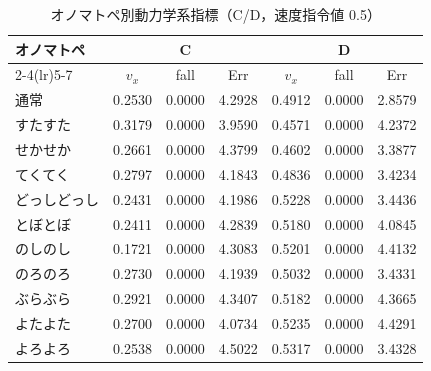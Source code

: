 \begin{table}[H]
  \centering
  \caption{オノマトペ別動力学系指標（C/D，速度指令値 0.5）}
  \label{tab:rl_cd_onom_dynamics}
  \small
  \setlength{\tabcolsep}{3.5pt}
  \begin{tabular}{lccc ccc} \toprule
    \textbf{オノマトペ} &
    \multicolumn{3}{c}{\textbf{C}} &
    \multicolumn{3}{c}{\textbf{D}} \\ \cmidrule(lr){2-4}\cmidrule(lr){5-7}
    & $v_x$ & fall & Err & $v_x$ & fall & Err \\ \midrule
    通常 & 0.2530 & 0.0000 & 4.2928 & 0.4912 & 0.0000 & 2.8579 \\
    すたすた & 0.3179 & 0.0000 & 3.9590 & 0.4571 & 0.0000 & 4.2372 \\
    せかせか & 0.2661 & 0.0000 & 4.3799 & 0.4602 & 0.0000 & 3.3877 \\
    てくてく & 0.2797 & 0.0000 & 4.1843 & 0.4836 & 0.0000 & 3.4234 \\
    どっしどっし & 0.2431 & 0.0000 & 4.1986 & 0.5228 & 0.0000 & 3.4436 \\
    とぼとぼ & 0.2411 & 0.0000 & 4.2839 & 0.5180 & 0.0000 & 4.0845 \\
    のしのし & 0.1721 & 0.0000 & 4.3083 & 0.5201 & 0.0000 & 4.4132 \\
    のろのろ & 0.2730 & 0.0000 & 4.1939 & 0.5032 & 0.0000 & 3.4331 \\
    ぶらぶら & 0.2921 & 0.0000 & 4.3407 & 0.5182 & 0.0000 & 4.3665 \\
    よたよた & 0.2700 & 0.0000 & 4.0734 & 0.5235 & 0.0000 & 4.4291 \\
    よろよろ & 0.2538 & 0.0000 & 4.5022 & 0.5317 & 0.0000 & 3.4328 \\
    \bottomrule
  \end{tabular}
\end{table}

